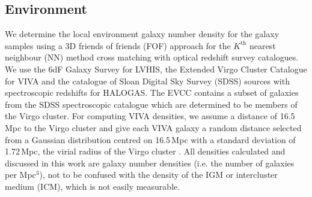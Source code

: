 \documentclass[fleqn,usenatbib]{mnras}
\begin{document}
\subsection{Environment}
\label{s-sec:environment}

We determine the local environment galaxy number density for the galaxy samples using a 3D friends of friends (FOF) approach for the $K^{\mathrm{th}}$ nearest neighbour (NN) method cross matching with optical redshift survey catalogues. We use the 6dF Galaxy Survey \citep[6dFGS,][]{Jones2009} for LVHIS, the Extended Virgo Cluster Catalogue \citep[EVCC,][]{Kim2014} for VIVA and the catalogue of Sloan Digital Sky Survey (SDSS) sources with spectroscopic redshifts \citep{Strauss2002} for HALOGAS. The EVCC contains a subset of galaxies from the SDSS spectroscopic catalogue which are determined to be members of the Virgo cluster. For computing VIVA densities, we assume a distance of 16.5\,Mpc to the Virgo cluster \citep{Mei2007} and give each VIVA galaxy a random distance selected from a Gaussian distribution centred on 16.5\,Mpc with a standard deviation of 1.72\,Mpc, the virial radius of the Virgo cluster \citep{Hoffman1980}. All densities calculated and discussed in this work are galaxy number densities (i.e. the number of galaxies per Mpc$^3$), not to be confused with the density of the IGM or intercluster medium (ICM), which is not easily measurable.
\end{document}
